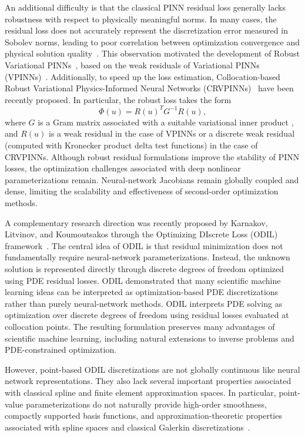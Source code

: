 \documentclass[review]{elsarticle}
\begin{document}
An additional difficulty is that the classical PINN residual loss generally lacks robustness with respect to physically meaningful norms. In many cases, the residual loss does not accurately represent the discretization error measured in Sobolev norms, leading to poor correlation between optimization convergence and physical solution quality~\cite{rvpinn}. This observation motivated the development of Robust Variational PINNs~\cite{rvpinn}, based on the weak residuals of Variational PINNs (VPINNs)~\cite{vpinn}. 
Additionally, to speed up the loss estimation,  Collocation-based Robust Variational Physics-Informed Neural Networks (CRVPINNs)~\cite{crvpinn} have been recently proposed. In particular, the robust loss takes the form
\begin{equation}
 \Phi(u)=R(u)^T G^{-1}R(u),
\end{equation}
where $G$ is a Gram matrix associated with a suitable variational inner product \cite{rvpinn}, and $R(u)$ is a weak residual in the case of VPINNs or a discrete weak residual (computed with Kronecker product delta test functions) in the case of CRVPINNs.
Although robust residual formulations improve the stability of PINN losses, the optimization challenges associated with deep nonlinear parameterizations remain. Neural-network Jacobians remain globally coupled and dense, limiting the scalability and effectiveness of second-order optimization methods.

A complementary research direction was recently proposed by Karnakov, Litvinov, and Koumoutsakos through the Optimizing DIscrete Loss (ODIL) framework~\cite{odil}. The central idea of ODIL is that residual minimization does not fundamentally require neural-network parameterizations. Instead, the unknown solution is represented directly through discrete degrees of freedom optimized using PDE residual losses. ODIL demonstrated that many scientific machine learning ideas can be interpreted as optimization-based PDE discretizations rather than purely neural-network methods.
ODIL interprets PDE solving as optimization over discrete degrees of freedom using residual losses evaluated at collocation points. The resulting formulation preserves many advantages of scientific machine learning, including natural extensions to inverse problems and PDE-constrained optimization.

However, point-based ODIL discretizations are not globally continuous like neural network representations. They also lack several important properties associated with classical spline and finite element approximation spaces. In particular, point-value parameterizations do not naturally provide high-order smoothness, compactly supported basis functions,
and approximation-theoretic properties associated with spline spaces and classical Galerkin discretizations~\cite{quarteroni}.
\end{document}
